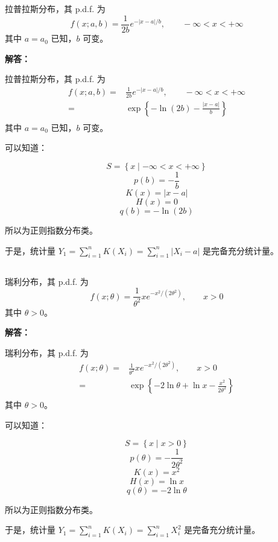 \documentclass[12pt,a4paper]{article}
\begin{document}
\subsection{} 
 
拉普拉斯分布，其 p.d.f. 为
    \[
        f(x;a,b)=\frac{1}{2b}e^{-|x-a|/b},\qquad -\infty<x<+\infty
    \]
    其中 $a=a_0$ 已知，$b$ 可变。

\begin{answerbox}
\textbf{解答：}

拉普拉斯分布，其 p.d.f. 为
\[
\begin{aligned}
f(x;a,b)=&\frac{1}{2b}e^{-|x-a|/b},\qquad -\infty<x<+\infty \\
=& \exp\left\{-\ln(2b)-\frac{|x-a|}{b}\right\} \\
\end{aligned}
\]
其中 $a=a_0$ 已知，$b$ 可变。

可以知道：

$$
S = \left\{x \mid -\infty < x < +\infty\right\}
$$
$$
p(b) = -\frac{1}{b}
$$
$$
K(x) = |x-a|
$$
$$
H(x) = 0
$$
$$
q(b) = -\ln(2b)
$$

所以为正则指数分布类。

于是，统计量 $Y_1 = \sum_{i=1}^{n} K(X_i) = \sum_{i=1}^{n} |X_i-a|$ 是完备充分统计量。

\end{answerbox}

\subsection{} 
 
瑞利分布，其 p.d.f. 为
    \[
        f(x;\theta)=\frac{1}{\theta^2}x e^{-x^2/(2\theta^2)},\qquad x>0
    \]
    其中 $\theta>0$。

\begin{answerbox}
\textbf{解答：}

瑞利分布，其 p.d.f. 为
\[
\begin{aligned}
f(x;\theta)=&\frac{1}{\theta^2}x e^{-x^2/(2\theta^2)},\qquad x>0 \\
=& \exp\left\{-2\ln \theta + \ln x - \frac{x^2}{2\theta^2}\right\} \\
\end{aligned}
\]
其中 $\theta>0$。

可以知道：

$$
S = \left\{x \mid x > 0\right\}
$$
$$
p(\theta) = -\frac{1}{2\theta^2}
$$
$$
K(x) = x^2
$$
$$
H(x) = \ln x
$$
$$
q(\theta) = -2\ln \theta
$$

所以为正则指数分布类。

于是，统计量 $Y_1 = \sum_{i=1}^{n} K(X_i) = \sum_{i=1}^{n} X_i^2$ 是完备充分统计量。



\end{answerbox}
\end{document}
